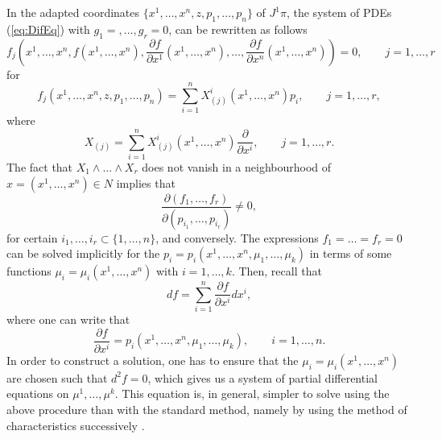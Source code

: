 \documentclass[12pt]{article}
\theoremstyle{plain}
\theoremstyle{definition}
\numberwithin{equation}{section}
\begin{document}
 In the adapted coordinates $\{x^1,\ldots,x^n,z,p_1,\ldots,p_n\}$ of $J^1\pi$, the system of PDEs (\ref{eq:DifEq}) with $g_1=,\ldots,g_r=0$, can be rewritten as follows
$$
f_j\left(x^1,\ldots,x^n,f(x^1,\ldots,x^n),\frac{\partial f}{\partial x^1}(x^1,\ldots,x^n),\ldots,\frac{\partial f}{\partial x^n}(x^1,\ldots,x^n)\right)=0,\qquad j=1,\ldots,r
$$
for\begin{equation*}%
f_j(x^1,\ldots,x^n,z,p_1,\ldots,p_n)=\sum_{i=1}^nX_{(j)}^i(x^1,\ldots,x^n)p_i,\qquad j=1,\ldots,r,
\end{equation*}
where 
$$
X_{(j)}=\sum_{i=1}^nX_{(j)}^i(x^1,\ldots,x^n)\frac{\partial}{\partial x^i},\qquad j=1,\ldots,r.
$$
The fact that $X_1\wedge\ldots\wedge X_r$ does not vanish in a neighbourhood of $x=(x^1,\ldots,x^n)\in N$ implies that
$$
\frac{\partial (f_1,\ldots,f_r)}{\partial (p_{i_1},\ldots,p_{i_r})}\neq0,
$$
for certain $i_1,\ldots,i_r\subset \{1,\ldots,n\}$, and conversely.
The expressions $f_1=\ldots=f_r=0$ can be solved implicitly for the $p_i=p_i(x^1,\ldots,x^n,\mu_1,\ldots,\mu_k)$ in terms of some functions $\mu_i=\mu_i(x^1,\ldots,x^n)$ with $i=1,\ldots,k$. Then, recall that 
$$
df=\sum_{i=1}^n\frac{\partial f}{\partial x^i}dx^i,
$$
where one can write that 
$$
\frac{\partial f}{\partial x^i}=p_i(x^1,\ldots,x^n,\mu_1,\ldots,\mu_k),\qquad i=1,\ldots,n.
$$
In order to construct a solution, one has to ensure that the $\mu_i=\mu_i(x^1,\ldots,x^n)$ are chosen such that
$d^2f=0$,
which gives us a system of partial differential equations on $\mu^1,\ldots,\mu^k$. This equation is, in general, simpler to solve using the above procedure than with the standard method, namely by using the method of characteristics successively \cite{CL11}. 
\end{document}
